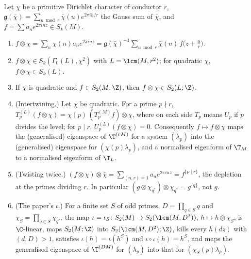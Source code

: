 \begin{proposition}\label{prop:hecke:twist-operator}
Let $\chi$ be a primitive Dirichlet character of conductor $r$, $\mathfrak g(\bar\chi)=\sum_{u\bmod r}\bar\chi(u)e^{2\pi iu/r}$ the Gauss sum of $\bar\chi$, and $f=\sum a_ne^{2\pi inz}\in S_k(M)$.
\begin{enumerate}[label=(\roman*)]
\item $f\otimes\chi=\sum_n\chi(n)a_ne^{2\pi inz}=\mathfrak g(\bar\chi)^{-1}\sum_{u\bmod r}\bar\chi(u)\,f\bigl(z+\tfrac ur\bigr)$.
\item $f\otimes\chi\in S_k(\Gamma_0(L),\chi^2)$ with $L=\lcm(M,r^2)$; for quadratic $\chi$, $f\otimes\chi\in S_k(L)$.
\item If $\chi$ is quadratic and $f\in S_2(M;\Z)$, then $f\otimes\chi\in S_2(L;\Z)$.
\item (Intertwining.) Let $\chi$ be quadratic. For a prime $p\nmid r$, $T_p^{(L)}(f\otimes\chi)=\chi(p)\,(T_p^{(M)}f)\otimes\chi$, where on each side $T_p$ means $U_p$ if $p$ divides the level; for
$p\mid r$, $U_p^{(L)}(f\otimes\chi)=0$. Consequently $f\mapsto f\otimes\chi$ maps the (generalised) eigenspace of $\T^{(rM)}$ for a system $(\lambda_p)$ into the (generalised) eigenspace for
$(\chi(p)\lambda_p)$, and a normalised eigenform of $\T_M$ to a normalised eigenform of $\T_L$.
\item (Twisting twice.) $(f\otimes\chi)\otimes\bar\chi=\sum_{(n,r)=1}a_ne^{2\pi inz}=f^{\{p\mid r\}}$, the depletion at the primes dividing $r$. In particular $(g\otimes\chi_{q^*})\otimes\chi_{q^*}=g^{\{q\}}$, not $g$.
\item (The paper's $\iota$.) For a finite set $S$ of odd primes, $D=\prod_{q\in S}q$ and $\chi_S=\prod_{q\in S}\chi_{q^*}$, the map $\iota=\iota_S\colon S_2(M)\to S_2(\lcm(M,D^2))$, $h\mapsto h\otimes\chi_S$, is
$\C$-linear, maps $S_2(M;\Z)$ into $S_2(\lcm(M,D^2);\Z)$, kills every $h(dz)$ with $(d,D)>1$, satisfies $\iota(h)=\iota(h^S)$ and $\iota\circ\iota(h)=h^S$, and maps the generalised eigenspace of $\T^{(DM)}$ for
$(\lambda_p)$ into that for $(\chi_S(p)\lambda_p)$.
\end{enumerate}
\end{proposition}

